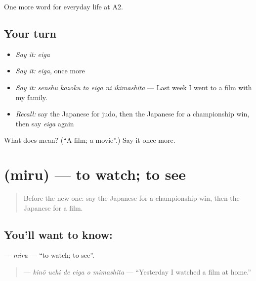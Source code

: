 \begin{grammarlens}[title={What you've built}]
One more word for everyday life at A2.
\end{grammarlens}

\subsection*{Your turn}
\begin{itemize}
\raggedright
  \item \emph{Say it:} \emph{eiga}
  \item \emph{Say it:} \emph{eiga}, once more
  \item \emph{Say it:} \emph{senshū kazoku to eiga ni ikimashita} — Last week I went to a film with my family.
  \item \emph{Recall:} say the Japanese for judo, then the Japanese for a championship win, then say \emph{eiga} again
\end{itemize}

\begin{tcolorbox}[breakable,colback=teal!4,colframe=teal!35!black,title={Before you move on}]
What does  mean? (\textquotedblleft{}A film; a movie\textquotedblright{}.) Say it once more.
\end{tcolorbox}
\section[\texorpdfstring{\ja{みる} (miru)}{みる (miru)}]{ (miru) — to watch; to see}

\label{lesson:JA-C236-miru}



\begin{quote}
Before the new one: say the Japanese for a championship win, then the Japanese for a film.
\end{quote}

\subsection*{You'll want to know: }
\textbf{} — \emph{miru} — \textquotedblleft{}to watch; to see\textquotedblright{}.

\begin{quote}
\textbf{   } — \emph{kinō uchi de eiga o mimashita} — \textquotedblleft{}Yesterday I watched a film at home.\textquotedblright{}
\end{quote}

